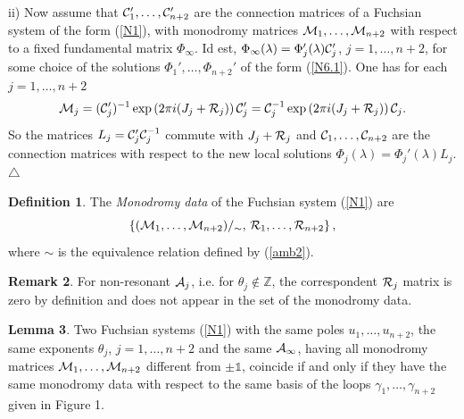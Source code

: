 \documentclass[12pt]{article}
\newcommand{\ID}{\mathbb{1}}
\newcommand {\interi}{\mathbb Z}
\theoremstyle{definition}
\newtheorem{df}{Definition}
\newtheorem{rmk}[df]{Remark}
\theoremstyle{theorem}
\newtheorem{lm}[df]{Lemma}
\begin{document}
ii) Now assume that ${\cal C}'_1,\dots, {\cal C}'_{n+2}$ 
are the connection matrices of a Fuchsian system of the form 
(\ref{N1}), with monodromy matrices ${\cal M}_1,\dots,{\cal M}_{n+2}$ 
with respect to a fixed fundamental matrix $\Phi_\infty$. Id est, 
$\Phi_\infty(\lambda)=\Phi_j'(\lambda){\cal C}'_j$, $j=1,\dots,n+2$, for
some choice of the solutions $\Phi_1',\dots,\Phi_{n+2}'$ of the
form (\ref{N6.1}). One has for each $j=1,\dots,n+2$
\begin{equation}
{\cal M}_j=
({\cal C}'_j)^{-1} \exp\left(2\pi i(J_j+{\cal R}_j)\right){\cal C}'_j=
{\cal C}_j^{-1}\exp\left(2\pi i(J_j+{\cal R}_j)\right){\cal C}_j.
\end{equation}
So the matrices $L_j={\cal C}'_j {\cal C}_j^{-1}$ commute with 
$J_j+{\cal R}_j$ and ${\cal C}_1,\dots,{\cal C}_{n+2}$ are the
connection matrices with respect to the new 
local solutions $\Phi_j(\lambda)=\Phi_j'(\lambda)L_j$.
{\hfill $\bigtriangleup$}




\begin{df}
The {\it Monodromy data}\/ of the Fuchsian system (\ref{N1}) are 
\begin{equation}
\left\{({\cal M}_1,\dots,{\cal M}_{n+2})
\slash_\sim,\,
{\cal R}_1,\dots,{\cal R}_{n+2}\right\},
\end{equation}
where $\sim$ is the equivalence relation defined by (\ref{amb2}).
\label{df2.6}
\end{df}

\begin{rmk}
For non-resonant ${\cal A}_j$, i.e. for $\theta_j\not\in\interi$, 
the correspondent ${\cal R}_j$ matrix is zero by definition and does 
not appear in the set of the monodromy data.
\label{rmk2.7}
\end{rmk}




\begin{lm}
Two Fuchsian systems (\ref{N1}) with the same poles
$u_1,\dots,u_{n+2}$, the same exponents $\theta_j$,
$j=1,\dots,n+2$ and the same ${\cal A}_\infty$, having all monodromy
matrices ${\cal M}_1,\dots,{\cal M}_{n+2}$ different from $\pm\ID$, 
coincide if and only if they have the same monodromy data with respect 
to the same basis of the loops $\gamma_1,\dots,\gamma_{n+2}$ given 
in Figure 1. 
\label{lm2.8}
\end{lm}
\end{document}
